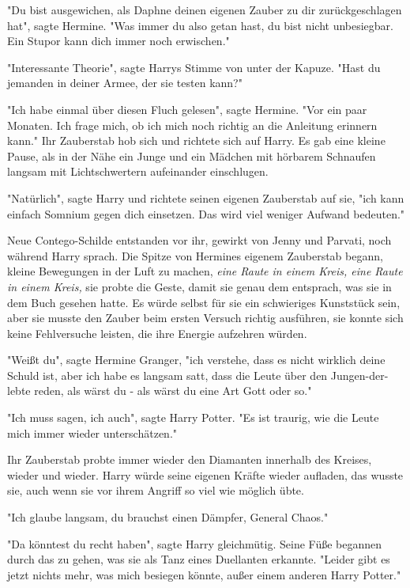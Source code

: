{"Du bist ausgewichen, als Daphne deinen eigenen Zauber zu dir zurückgeschlagen hat", sagte Hermine. "Was immer du also getan hast, du bist nicht unbesiegbar. Ein Stupor kann dich immer noch erwischen."

"Interessante Theorie", sagte Harrys Stimme von unter der Kapuze. "Hast du jemanden in deiner Armee, der sie testen kann?"

"Ich habe einmal über diesen Fluch gelesen", sagte Hermine. "Vor ein paar Monaten. Ich frage mich, ob ich mich noch richtig an die Anleitung erinnern kann." Ihr Zauberstab hob sich und richtete sich auf Harry. Es gab eine kleine Pause, als in der Nähe ein Junge und ein Mädchen mit hörbarem Schnaufen langsam mit Lichtschwertern aufeinander einschlugen.

"Natürlich", sagte Harry und richtete seinen eigenen Zauberstab auf sie, "ich kann einfach Somnium gegen dich einsetzen. Das wird viel weniger Aufwand bedeuten."

Neue Contego-Schilde entstanden vor ihr, gewirkt von Jenny und Parvati, noch während Harry sprach. Die Spitze von Hermines eigenem Zauberstab begann, kleine Bewegungen in der Luft zu machen, \emph{eine Raute in einem Kreis, eine Raute in einem Kreis,} sie probte die Geste, damit sie genau dem entsprach, was sie in dem Buch gesehen hatte. Es würde selbst für sie ein schwieriges Kunststück sein, aber sie musste den Zauber beim ersten Versuch richtig ausführen, sie konnte sich keine Fehlversuche leisten, die ihre Energie aufzehren würden.

"Weißt du", sagte Hermine Granger, "ich verstehe, dass es nicht wirklich deine Schuld ist, aber ich habe es langsam satt, dass die Leute über den Jungen-der-lebte reden, als wärst du - als wärst du eine Art Gott oder so."

"Ich muss sagen, ich auch", sagte Harry Potter. "Es ist traurig, wie die Leute mich immer wieder unterschätzen."

Ihr Zauberstab probte immer wieder den Diamanten innerhalb des Kreises, wieder und wieder. Harry würde seine eigenen Kräfte wieder aufladen, das wusste sie, auch wenn sie vor ihrem Angriff so viel wie möglich übte.

"Ich glaube langsam, du brauchst einen Dämpfer, General Chaos."

"Da könntest du recht haben", sagte Harry gleichmütig. Seine Füße begannen durch das zu gehen, was sie als Tanz eines Duellanten erkannte. "Leider gibt es jetzt nichts mehr, was mich besiegen könnte, außer einem anderen Harry Potter."

}
